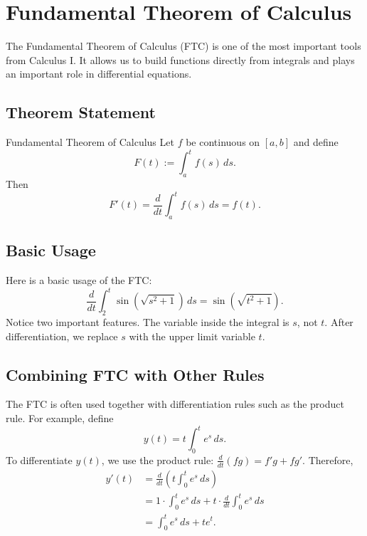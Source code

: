 \documentclass[letterpaper]{article}
\begin{document}
\section{Fundamental Theorem of Calculus}

The Fundamental Theorem of Calculus (FTC) is one of the most important tools from Calculus I. 
It allows us to build functions directly from integrals and plays an important role in differential equations.

\subsection{Theorem Statement}

\begin{theorem}{Fundamental Theorem of Calculus}
Let $f$ be continuous on $[a,b]$ and define
\[
F(t):=\int_a^t f(s)\,ds.
\]
Then
\[
F'(t)=\frac{d}{dt}\int_a^t f(s)\,ds = f(t).
\]
\end{theorem}

\subsection{Basic Usage}
Here is a basic usage of the FTC:
\[
\frac{d}{dt}\int_2^t \sin(\sqrt{s^2+1})\,ds
=
\sin(\sqrt{t^2+1}).
\]
Notice two important features. The variable inside the integral is $s$, not $t$. After differentiation, we replace $s$ with the upper limit variable $t$.



\subsection{Combining FTC with Other Rules}

The FTC is often used together with differentiation rules such as the product rule. For example, define
\[
y(t)= t\int_0^t e^s\,ds.
\]
To differentiate $y(t)$, we use the product rule: $\frac{d}{dt}(fg)=f'g+fg'$. Therefore,
\begin{align*}
y'(t)
&=
\frac{d}{dt}\left(t\int_0^t e^s\,ds\right)\\
&=
1\cdot \int_0^t e^s\,ds
+
t\cdot \frac{d}{dt}\int_0^t e^s\,ds\\
&=
\int_0^t e^s\,ds + te^t.
\end{align*}
\end{document}
